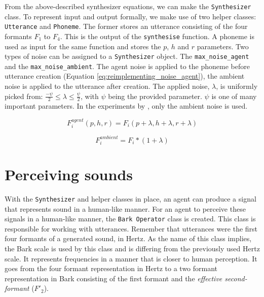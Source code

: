 From the above-described synthesizer equations, we can make the \texttt{Synthesizer} class.
To represent input and output formally, we make use of two helper classes: \texttt{Utterance} and \texttt{Phoneme}.
The former stores an utterance consisting of the four formants $F_1$ to $F_4$.
This is the output of the \texttt{synthesise} function.
A phoneme is used as input for the same function and stores the $p$, $h$ and $r$ parameters.
Two types of noise can be assigned to a \texttt{Synthesizer} object.
The \texttt{max\_noise\_agent} and the \texttt{max\_noise\_ambient}.
The agent noise is applied to the phoneme before utterance creation (Equation \ref{eq:reimplementing_noise_agent}), the ambient noise is applied to the utterance after creation.
The applied noise, $\lambda$, is uniformly picked from: $\frac{-\psi}{2} \leq \lambda \leq \frac{\psi}{2}$, with $\psi$ being the provided parameter.
$\psi$ is one of many important parameters.
In the experiments by \citet{deBoer2000}, only the ambient noise is used.

\begin{equation}
F^{agent}_{i}(p, h, r) = F_{i}(p + \lambda, h + \lambda, r + \lambda)
\label{eq:reimplementing_noise_agent}
\end{equation}

\begin{equation}
F^{ambient}_{i} = F_{i} * (1 + \lambda)
\label{eq:reimplementing_noise_ambient}
\end{equation}

\section{Perceiving sounds}
\label{sec:reimplementing_perceive}

With the \texttt{Synthesizer} and helper classes in place, an agent can produce a signal that represents sound in a human-like manner.
For an agent to perceive these signals in a human-like manner, the \texttt{Bark Operator} class is created.
This class is responsible for working with utterances.
Remember that utterances were the first four formants of a generated sound, in Hertz.
As the name of this class implies, the Bark scale is used by this class and is differing from the previously used Hertz scale. 
It represents frequencies in a manner that is closer to human perception.
It goes from the four formant representation in Hertz to a two formant representation in Bark consisting of the first formant and the \textit{effective second-formant} ($F'_2$).

